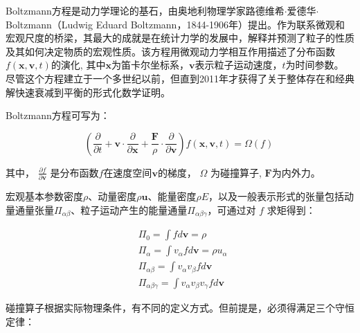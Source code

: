 \documentclass[LBMDerivation.tex]{subfiles}
\begin{document}
Boltzmann方程是动力学理论的基石，由奥地利物理学家路德维希$\cdot$爱德华$\cdot$Boltzmann（Ludwig Eduard Boltzmann，1844-1906年）提出。作为联系微观和宏观尺度的桥梁，其最大的成就是在统计力学的发展中，解释并预测了粒子的性质及其如何决定物质的宏观性质。该方程用微观动力学相互作用描述了分布函数$f(\boldsymbol{x}, \boldsymbol{v
  }, t)$的演化, 其中$\boldsymbol{x}$为笛卡尔坐标系，$\boldsymbol{v}$表示粒子运动速度，$t$为时间参数。 尽管这个方程建立于一个多世纪以前，但直到2011年才获得了关于整体存在和经典解快速衰减到平衡的形式化数学证明。


Boltzmann方程可写为：


\begin{equation}
  \boxed{
    \left(\frac{ \partial  }{ \partial t}+ \boldsymbol{v} \cdot \frac{\partial}{\partial \boldsymbol{x}} + \frac{\boldsymbol{F} }{\rho} \cdot \frac{\partial }{\partial \boldsymbol{v}}  \right) f(\boldsymbol{x}, \boldsymbol{v}, t) = \Omega  \left( f \right)
  }
  \label{EQUATION::Bolzmann笛卡尔} ~
\end{equation}


​其中， $\frac{\partial f}{\partial \boldsymbol{v}}$ 是分布函数$f$在速度空间$\boldsymbol{v}$的梯度， $\Omega $ 为碰撞算子, $\boldsymbol{F}$为内外力。

宏观基本参数密度$\rho$、动量密度$\rho \boldsymbol{u}$、能量密度$\rho E$，以及一般表示形式的张量包括动量通量张量$\Pi_{\alpha \beta}$、粒子运动产生的能量通量$\Pi_{\alpha \beta \gamma}$，可通过对 $f$ 求矩得到：

\begin{equation}
  \begin{aligned}
     & \Pi _{0}= \int fd\boldsymbol{v} = \rho                                                      \\
     & \Pi_{\alpha}=\int v_{ \alpha }  fd\boldsymbol{v} = \rho u_{\alpha}                          \\
     & \Pi _{ \alpha  \beta } = \int v_{ \alpha } v_{ \beta }fd\boldsymbol{v}                      \\
     & \Pi _{ \alpha  \beta  \gamma}=  \int v_{ \alpha } v_{ \beta } v_{ \gamma}  fd\boldsymbol{v}
  \end{aligned}
  \label{EQUATION::定义张量} ~
\end{equation}








碰撞算子根据实际物理条件，有不同的定义方式。但前提是，必须得满足三个守恒定律：
\end{document}
